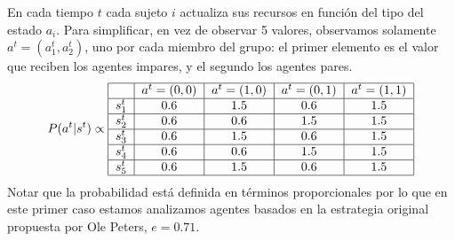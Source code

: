 \documentclass[a4paper,10pt]{article}
\begin{document}
%
En cada tiempo $t$ cada sujeto $i$ actualiza sus recursos en función del tipo del estado $a_i$.
Para simplificar, en vez de observar 5 valores, observamos solamente $a^t=(a^t_1, a^t_2)$, uno por cada miembro del grupo: el primer elemento es el valor que reciben los agentes impares, y el segundo los agentes pares. 
%
\begin{align}
\centering
P(a^{t}|s^{t}) \propto \begin{tabular}{|c|c|c|c|c|c|c|}
        \hline
        & $a^t=(0,0)$ & $a^t=(1,0)$ & $a^t=(0,1)$ &  $a^t=(1,1)$  \\ \hline
       $s^{t}_1$ & $0.6$ & $1.5$ & $0.6$ & $1.5$ \\ \hline
       $s^{t}_2$ & $0.6$ & $0.6$ & $1.5$ & $1.5$  \\ \hline
       $s^{t}_3$ & $0.6$ & $1.5$ & $0.6$ & $1.5$  \\ \hline
       $s^{t}_4$ & $0.6$ & $0.6$ & $1.5$ & $1.5$ \\ \hline
       $s^{t}_5$ & $0.6$ & $1.5$ & $0.6$ & $1.5$ \\ \hline
\end{tabular}
\end{align}
Notar que la probabilidad está definida en términos proporcionales por lo que en este primer caso estamos analizamos agentes basados en la estrategia original propuesta por Ole Peters, $e=0.71$.

\end{document}
